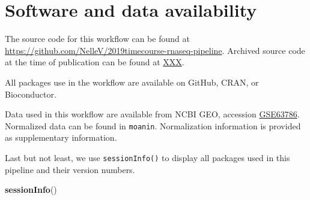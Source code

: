 \documentclass[9pt,a4paper,]{extarticle}
\newenvironment{Shaded}{\begin{snugshade}}{\end{snugshade}}
\newcommand{\KeywordTok}[1]{\textcolor[rgb]{0.13,0.29,0.53}{\textbf{#1}}}
\newcommand{\NormalTok}[1]{#1}
\begin{document}
\hypertarget{software-and-data-availability}{%
\section{Software and data availability}\label{software-and-data-availability}}

The source code for this workflow can be found at
\url{https://github.com/NelleV/2019timecourse-rnaseq-pipeline}.
Archived source code at the time of publication can be found at \url{XXX}.

All packages use in the workflow are available on GitHub, CRAN, or
Bioconductor.

Data used in this workflow are available from NCBI GEO, accession
\href{https://www.ncbi.nlm.nih.gov/geo/query/acc.cgi?acc=GSE63786}{GSE63786}.
Normalized data can be found in \texttt{moanin}. Normalization information is
provided as supplementary information.

Last but not least, we use \texttt{sessionInfo()} to display all packages used in
this pipeline and their version numbers.

\begin{Shaded}
\begin{Highlighting}[]
\KeywordTok{sessionInfo}\NormalTok{()}
\end{Highlighting}
\end{Shaded}
\end{document}

